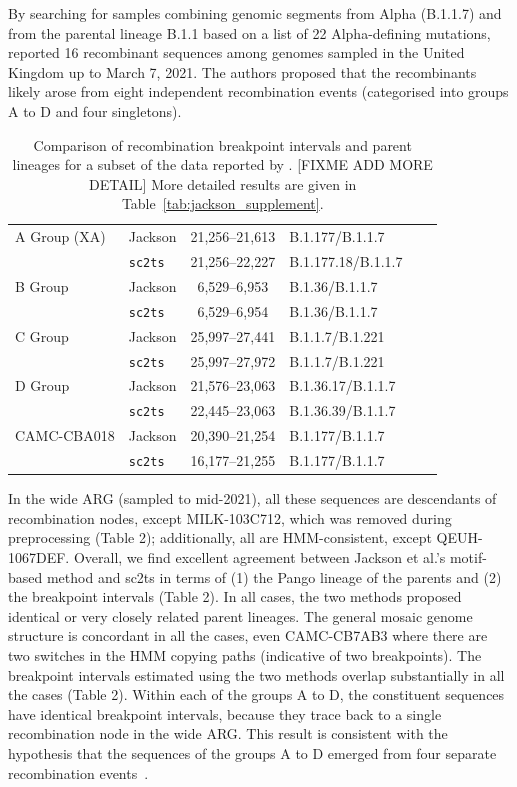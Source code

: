 \documentclass{article}
\begin{document}
By searching for samples combining genomic segments from Alpha (B.1.1.7) and
from the parental lineage B.1.1 based on a list of 22 Alpha-defining mutations,
\citet{Jackson2021-ik} reported 16 recombinant sequences among genomes sampled
in the United Kingdom up to March 7, 2021. The authors proposed that the
recombinants likely arose from eight independent recombination events
(categorised into groups A to D and four singletons).


\begin{table} \centering
\begin{tabular}{ll|clll}
\toprule
A Group (XA) & Jackson        &  21,256–21,613 & B.1.177/B.1.1.7 \\
             & \texttt{sc2ts} &  21,256--22,227 & B.1.177.18/B.1.1.7 \\
\midrule
B Group & Jackson        &  6,529--6,953 & B.1.36/B.1.1.7  \\
        & \texttt{sc2ts} &  6,529--6,954 & B.1.36/B.1.1.7  \\
\midrule
C Group & Jackson        &  25,997--27,441 &  B.1.1.7/B.1.221 \\
        & \texttt{sc2ts} &  25,997--27,972 &  B.1.1.7/B.1.221 \\
\midrule
D Group & Jackson        &  21,576--23,063 &  B.1.36.17/B.1.1.7 \\
        & \texttt{sc2ts} &  22,445--23,063 &  B.1.36.39/B.1.1.7 \\
\midrule
CAMC-CBA018 & Jackson        &  20,390--21,254 & B.1.177/B.1.1.7 \\
            & \texttt{sc2ts} &  16,177--21,255 & B.1.177/B.1.1.7 \\
\midrule
\end{tabular}
\caption{\label{tab:jackson}Comparison of recombination breakpoint intervals and parent lineages for a subset of the data reported by \cite{Jackson2021-ik}. [FIXME ADD MORE DETAIL] More detailed results are given in Table~\ref{tab:jackson_supplement}.}
\end{table}

In the wide ARG (sampled to mid-2021), all these sequences are descendants of
recombination nodes, except MILK-103C712, which was removed during
preprocessing (Table 2); additionally, all are HMM-consistent, except
QEUH-1067DEF. Overall, we find excellent agreement between Jackson et al.’s
motif-based method and sc2ts in terms of (1) the Pango lineage of the parents
and (2) the breakpoint intervals (Table 2). In all cases, the two methods
proposed identical or very closely related parent lineages. The general mosaic
genome structure is concordant in all the cases, even CAMC-CB7AB3 where there
are two switches in the HMM copying paths (indicative of two breakpoints). The
breakpoint intervals estimated using the two methods overlap substantially in
all the cases (Table 2). Within each of the groups A to D, the constituent
sequences have identical breakpoint intervals, because they trace back to a
single recombination node in the wide ARG. This result is consistent with the
hypothesis that the sequences of the groups A to D emerged from four separate
recombination events~\cite{Jackson2021-ik}.
\end{document}
